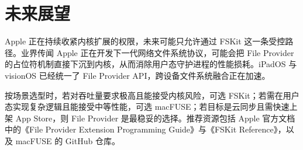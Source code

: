 \chapter{未来展望}
Apple 正在持续收紧内核扩展的权限，未来可能只允许通过 FSKit 这一条受控路径。业界传闻 Apple 正在开发下一代网络文件系统协议，可能会把 File Provider 的占位符机制直接下沉到内核，从而消除用户态守护进程的性能损耗。iPadOS 与 visionOS 已经统一了 File Provider API，跨设备文件系统融合正在加速。\par
按场景选型时，若对吞吐量要求极高且能接受内核风险，可选 FSKit；若需在用户态实现复杂逻辑且能接受中等性能，可选 macFUSE；若目标是云同步且需快速上架 App Store，则 File Provider 是最稳妥的选择。推荐资源包括 Apple 官方文档中的《File Provider Extension Programming Guide》与《FSKit Reference》，以及 macFUSE 的 GitHub 仓库。\par
